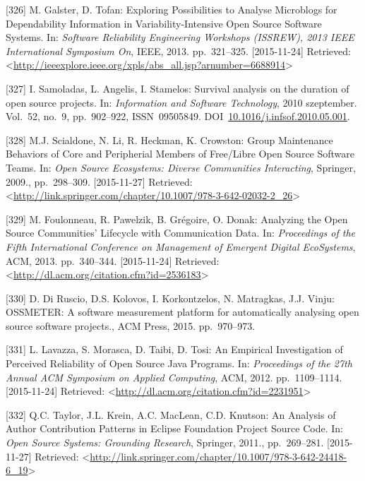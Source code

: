 \documentclass[12pt,magyar,a4paper,oneside]{scrreprt}
\newenvironment{cslreferences}%
  {}%
  {\par}
\begin{document}
\begin{cslreferences}
\leavevmode\hypertarget{ref-galster_exploring_2013}{}%
{[}326{]} M. Galster, D. Tofan: Exploring Possibilities to Analyse
Microblogs for Dependability Information in Variability-Intensive Open
Source Software Systems. In: \emph{Software Reliability Engineering
Workshops (ISSREW), 2013 IEEE International Symposium On}, IEEE, 2013.
pp.~321--325. {[}2015-11-24{]} Retrieved:
\textless{}\url{http://ieeexplore.ieee.org/xpls/abs_all.jsp?arnumber=6688914}\textgreater{}

\leavevmode\hypertarget{ref-samoladas_survival_2010}{}%
{[}327{]} I. Samoladas, L. Angelis, I. Stamelos: Survival analysis on
the duration of open source projects. In: \emph{Information and Software
Technology}, 2010 szeptember. Vol.~52, no.~9, pp.~902--922,
ISSN~09505849.
DOI~\href{https://doi.org/10.1016/j.infsof.2010.05.001}{10.1016/j.infsof.2010.05.001}.

\leavevmode\hypertarget{ref-scialdone_group_2009}{}%
{[}328{]} M.J. Scialdone, N. Li, R. Heckman, K. Crowston: Group
Maintenance Behaviors of Core and Peripherial Members of Free/Libre Open
Source Software Teams. In: \emph{Open Source Ecosystems: Diverse
Communities Interacting}, Springer, 2009., pp.~298--309.
{[}2015-11-27{]} Retrieved:
\textless{}\url{http://link.springer.com/chapter/10.1007/978-3-642-02032-2_26}\textgreater{}

\leavevmode\hypertarget{ref-foulonneau_analyzing_2013}{}%
{[}329{]} M. Foulonneau, R. Pawelzik, B. Grégoire, O. Donak: Analyzing
the Open Source Communities' Lifecycle with Communication Data. In:
\emph{Proceedings of the Fifth International Conference on Management of
Emergent Digital EcoSystems}, ACM, 2013. pp.~340--344. {[}2015-11-24{]}
Retrieved:
\textless{}\url{http://dl.acm.org/citation.cfm?id=2536183}\textgreater{}

\leavevmode\hypertarget{ref-di_ruscio_ossmeter_2015}{}%
{[}330{]} D. Di Ruscio, D.S. Kolovos, I. Korkontzelos, N. Matragkas,
J.J. Vinju: OSSMETER: A software measurement platform for automatically
analysing open source software projects., ACM Press, 2015. pp.~970--973.

\leavevmode\hypertarget{ref-lavazza_empirical_2012}{}%
{[}331{]} L. Lavazza, S. Morasca, D. Taibi, D. Tosi: An Empirical
Investigation of Perceived Reliability of Open Source Java Programs. In:
\emph{Proceedings of the 27th Annual ACM Symposium on Applied
Computing}, ACM, 2012. pp.~1109--1114. {[}2015-11-24{]} Retrieved:
\textless{}\url{http://dl.acm.org/citation.cfm?id=2231951}\textgreater{}

\leavevmode\hypertarget{ref-taylor_analysis_2011}{}%
{[}332{]} Q.C. Taylor, J.L. Krein, A.C. MacLean, C.D. Knutson: An
Analysis of Author Contribution Patterns in Eclipse Foundation Project
Source Code. In: \emph{Open Source Systems: Grounding Research},
Springer, 2011., pp.~269--281. {[}2015-11-27{]} Retrieved:
\textless{}\url{http://link.springer.com/chapter/10.1007/978-3-642-24418-6_19}\textgreater{}


\end{cslreferences}
\end{document}
